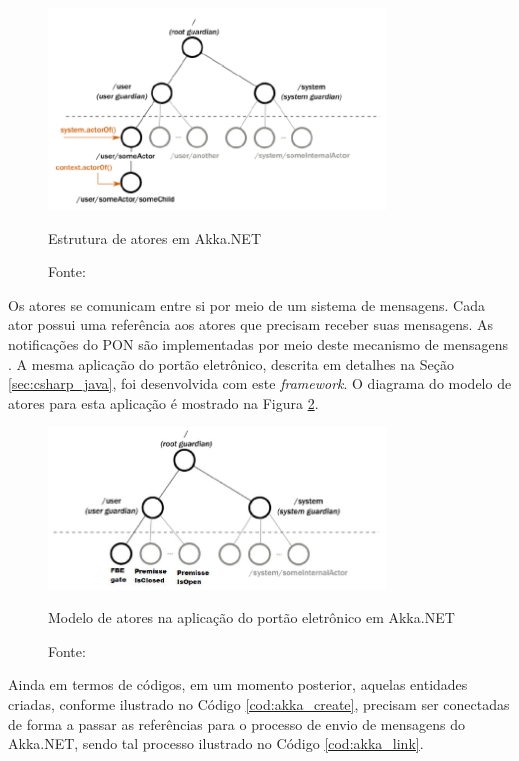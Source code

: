 \begin{figure}[!htb]
  \centering
  \includegraphics[width=0.8\textwidth]{../figures/atores_akka.png}
  \smallskip
  \caption{Estrutura de atores em Akka.NET}
  \caption*{Fonte: }
  \label{fig:akka_actor}
\end{figure}

Os atores se comunicam entre si por meio de um sistema de mensagens. Cada ator
possui uma referência aos atores que precisam receber suas mensagens. As
notificações do PON são implementadas por meio deste mecanismo de mensagens
\cite{martini_2019}. A mesma aplicação do portão eletrônico, descrita em
detalhes na Seção \ref{sec:csharp_java}, foi desenvolvida com este \textit{framework}.
O diagrama do modelo de atores para esta aplicação é mostrado na Figura
\ref{fig:akka_portao}.

\begin{figure}[!htb]
  \centering
  \includegraphics[width=0.8\textwidth]{../figures/akka_actor.png}
  \smallskip
  \caption{Modelo de atores na aplicação do portão eletrônico em Akka.NET}
  \caption*{Fonte: }
  \label{fig:akka_portao}
\end{figure}

Ainda em termos de códigos, em um momento posterior, aquelas entidades criadas,
conforme ilustrado no Código \ref{cod:akka_create}, precisam ser conectadas de
forma a passar as referências para o processo de envio de mensagens do Akka.NET,
sendo tal processo ilustrado no Código \ref{cod:akka_link}.

